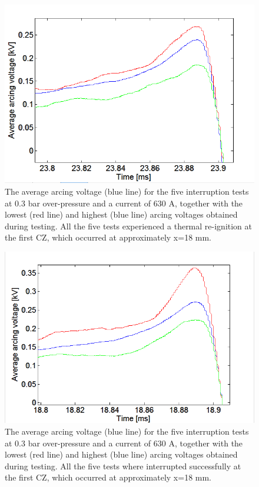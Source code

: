 \documentclass[10pt,b5paper,twoside]{article}
\begin{document}
\begin{figure}[H]
\centering
\includegraphics[scale=0.6, angle =0 ]{Bilder/Results/ArcingVoltage_18_reIgnition_average.PNG}
\caption{The average arcing voltage (blue line) for the five interruption tests at 0.3 bar over-pressure and a current of 630 A, together with the lowest (red line) and highest (blue line) arcing voltages obtained during testing. All the five tests experienced a thermal re-ignition at the first CZ, which occurred at approximately  x=18 mm.} \label{fig:18mmUnSuccessful_ave}
\end{figure}

\begin{figure}[H]
\centering
\includegraphics[scale=0.6, angle =0 ]{Bilder/Results/ArcingVoltage_18_none_reIgnition_average.PNG}
\caption{The average arcing voltage (blue line) for the five interruption tests at 0.3 bar over-pressure and a current of 630 A, together with the lowest (red line) and highest (blue line) arcing voltages obtained during testing. All the five tests where interrupted successfully at the first CZ, which occurred at approximately  x=18 mm.} \label{fig:18mmSuccessful_ave}
\end{figure}
\end{document}
